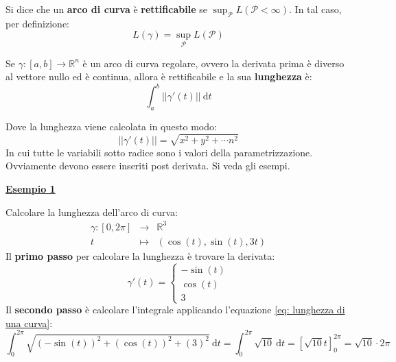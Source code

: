 \documentclass[a4paper]{article}
\newcommand{\definition}[1]{\textcolor{Red3}{\textbf{#1}}}
\newcommand{\example}[1]{\textcolor{Green4}{\textbf{#1}}}
\begin{document}
	\begin{boxdef}
		Si dice che un \definition{arco di curva} è \definition{rettificabile} se $\sup_{\mathcal{P}} L\left(\mathcal{P} < \infty\right)$. In tal caso, per definizione:
		\begin{equation*}
			L\left(\gamma\right) = \sup_{\mathcal{P}} L\left(\mathcal{P}\right)
		\end{equation*}
	\end{boxdef}

	\begin{boxdef}
		Se $\gamma : \left[a,b\right] \rightarrow \mathbb{R}^{n}$ è un arco di curva regolare, ovvero la derivata prima è diverso al vettore nullo ed è continua, allora è rettificabile e la sua \definition{lunghezza} è:
		\begin{equation}
			\displaystyle\int_{a}^{b} \left|\left| \gamma'\left(t\right) \right|\right| \: \mathrm{d}t
		\end{equation}
	\end{boxdef}

	\noindent
	Dove la lunghezza viene calcolata in questo modo:
	\begin{equation}\label{eq: lunghezza di una curva}
		\left|\left| \gamma'\left(t\right) \right|\right| = \sqrt{x^{2} + y^{2} + \cdots n^{2}}
	\end{equation}
	In cui tutte le variabili sotto radice sono i valori della parametrizzazione. Ovviamente devono essere inseriti post derivata. Si veda gli esempi.

	\begin{flushleft}
		\example{\underline{Esempio 1}}
	\end{flushleft}
	Calcolare la lunghezza dell'arco di curva:
	\begin{equation*}
		\begin{array}{rcl}
			\gamma:\left[0,2\pi\right] &\rightarrow& \mathbb{R}^{3} \\
			t &\mapsto& \left(\cos\left(t\right), \sin\left(t\right), 3t\right)
		\end{array}
	\end{equation*}
	Il \textbf{primo passo} per calcolare la lunghezza è trovare la derivata:
	\begin{equation*}
		\gamma'\left(t\right) = \begin{cases}
			-\sin\left(t\right) \\
			\cos\left(t\right) \\
			3
		\end{cases}
	\end{equation*}
	Il \textbf{secondo passo} è calcolare l'integrale applicando l'equazione \ref{eq: lunghezza di una curva}:
	\begin{equation*}
		\displaystyle\int_{0}^{2\pi} \sqrt{\left(-\sin\left(t\right)\right)^{2} + \left(\cos\left(t\right)\right)^{2} + \left(3\right)^{2}} \:\mathrm{d}t = \displaystyle\int_{0}^{2\pi} \sqrt{10} \:\mathrm{d}t = \left[\sqrt{10}t\right]_{0}^{2\pi} = \sqrt{10} \cdot 2\pi
	\end{equation*}\newpage
\end{document}
